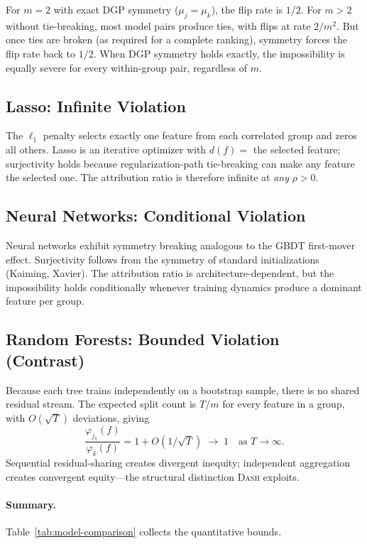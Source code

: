 \documentclass{jmlr}
\newcommand{\DASH}{\textsc{Dash}}
\newcommand{\GBDT}{\textsc{GBDT}}
\begin{document}
For $m = 2$ with exact DGP symmetry ($\mu_j = \mu_k$), the flip rate is $1/2$. For $m > 2$ without tie-breaking, most model pairs produce ties, with flips at rate $2/m^2$. But once ties are broken (as required for a complete ranking), symmetry forces the flip rate back to $1/2$. When DGP symmetry holds exactly, the impossibility is equally severe for every within-group pair, regardless of $m$.

\subsection{Lasso: Infinite Violation}
\label{sec:lasso}

The $\ell_1$ penalty selects exactly one feature from each correlated group and zeros all others. Lasso is an iterative optimizer with $d(f) =$ the selected feature; surjectivity holds because regularization-path tie-breaking can make any feature the selected one. The attribution ratio is therefore infinite at \emph{any} $\rho > 0$.

\subsection{Neural Networks: Conditional Violation}
\label{sec:nn}

Neural networks exhibit symmetry breaking analogous to the \GBDT{} first-mover effect. Surjectivity follows from the symmetry of standard initializations (Kaiming, Xavier). The attribution ratio is architecture-dependent, but the impossibility holds conditionally whenever training dynamics produce a dominant feature per group.

\subsection{Random Forests: Bounded Violation (Contrast)}
\label{sec:rf}

Because each tree trains independently on a bootstrap sample, there is no shared residual stream. The expected split count is $T/m$ for every feature in a group, with $O(\sqrt{T})$ deviations, giving
\[
    \frac{\varphi_{j_1}(f)}{\varphi_k(f)} = 1 + O(1/\sqrt{T}) \;\to\; 1 \quad \text{as } T \to \infty.
\]
Sequential residual-sharing creates divergent inequity; independent aggregation creates convergent equity---the structural distinction \DASH{} exploits.

\paragraph{Summary.}
Table~\ref{tab:model-comparison} collects the quantitative bounds.
\end{document}

